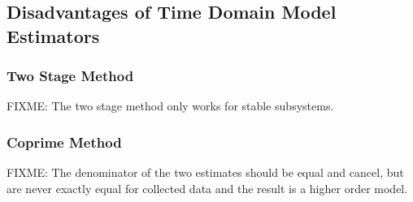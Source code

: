 \documentclass[11pt,a4paper]{article}
\begin{document}
\subsection{Disadvantages of Time Domain Model Estimators}
\subsubsection{Two Stage Method}
FIXME: The two stage method only works for stable subsystems.

\subsubsection{Coprime Method}
FIXME: The denominator of the two estimates should be equal and cancel, but are
never exactly equal for collected data and the result is a higher order model.
\end{document}
